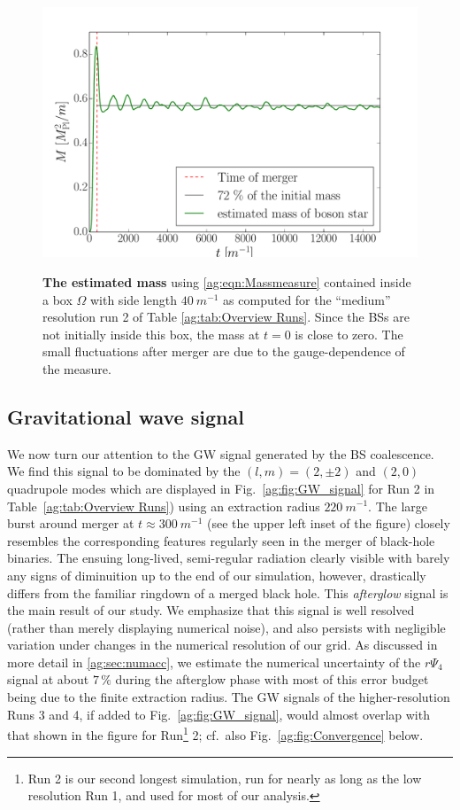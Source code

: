 \begin{figure}[h!]
\begin{center}
    {\includegraphics[width=0.7\columnwidth]{ag_fig/mass_over_time.pdf}}
    \caption{{\bf The estimated mass} using \ref{ag:eqn:Massmeasure} 
    contained inside a box $\Omega$ with side length $40~m^{-1}$ as computed for the ``medium'' 
    resolution run 2 of Table \ref{ag:tab:Overview Runs}. 
    Since the BSs are
    not initially inside this box, the mass at $t = 0$ is close to zero. The small fluctuations after merger
   are due to the gauge-dependence of the measure.
   }
\label{ag:fig:energy}
\end{center}
\end{figure}







\subsection{Gravitational wave signal}\label{ag:sec:GWs}



We now turn our attention to the GW signal generated by the
BS coalescence. We find this signal to be dominated by the
$(l,m)=(2,\pm 2)$ and $(2,0)$ quadrupole modes which are
displayed in Fig.~\ref{ag:fig:GW_signal} for Run 2 in Table~\ref{ag:tab:Overview Runs}) using an extraction
radius $220~m^{-1}$. The large burst around merger at $t\approx300~m^{-1}$ (see the upper left inset of the figure)
closely resembles the corresponding features
regularly seen in the merger of black-hole binaries.
The ensuing long-lived, semi-regular radiation clearly visible
with barely any signs of diminuition up to the end of our
simulation, however, drastically
differs from the familiar ringdown of a merged black hole. This
{\it afterglow} signal is the main result of our study. We
emphasize that this signal is well resolved (rather than
merely displaying numerical noise), and also persists with
negligible variation under changes in the numerical resolution
of our grid. As discussed in more detail in
\ref{ag:sec:numacc}, we estimate the numerical uncertainty
of the $r\Psi_4$ signal at about $7\,\%$ during the afterglow phase
with most of this error budget being due to the finite extraction radius.
The GW signals of the higher-resolution Runs 3 and 4, if added
to Fig.~\ref{ag:fig:GW_signal}, would almost overlap with
that shown in the figure for Run\footnote{Run 2 is our second longest simulation, run for nearly as long as the low resolution Run 1,
and used for most of our analysis.} 2;
cf.~also Fig.~\ref{ag:fig:Convergence} below.

